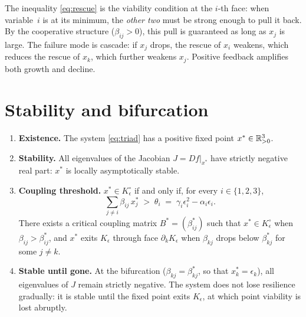 \begin{remark}\label{rem:mutual-rescue}
The inequality \eqref{eq:rescue} is the viability condition at
the $i$-th face: when variable~$i$ is at its minimum, the
\emph{other two} must be strong enough to pull it back.
By the cooperative structure ($\beta_{ij} > 0$), this pull is
guaranteed as long as $x_j$ is large.  The failure mode is
cascade: if $x_j$ drops, the rescue of $x_i$ weakens, which
reduces the rescue of $x_k$, which further weakens $x_j$.
Positive feedback amplifies both growth and decline.
\end{remark}

\section{Stability and bifurcation}\label{sec:triad-bifurcation}

\begin{theorem}
\label{thm:triad}
\hfill
\begin{enumerate}[label=(\alph*)]
  \item \textbf{Existence.}  The system \eqref{eq:triad} has a
    positive fixed point $x^* \in \mathbb{R}^3_{> 0}$.
  \item \textbf{Stability.}  All eigenvalues of the Jacobian
    $J = Df|_{x^*}$ have strictly negative real part:
    $x^*$ is locally asymptotically stable.
  \item \textbf{Coupling threshold.}  $x^* \in K_\epsilon^\circ$
    if and only if, for every $i \in \{1,2,3\}$,
    \begin{equation}\label{eq:coupling-threshold}
      \sum_{j \neq i} \beta_{ij}\, x_j^*
      \;>\;
      \theta_i
      \;=\;
      \gamma_i \epsilon_i^2 - \alpha_i \epsilon_i.
    \end{equation}
    There exists a critical coupling matrix
    $B^* = (\beta_{ij}^*)$ such that
    $x^* \in K_\epsilon^\circ$ when $\beta_{ij} > \beta_{ij}^*$,
    and $x^*$ exits $K_\epsilon$ through face
    $\partial_k K_\epsilon$ when $\beta_{kj}$ drops below
    $\beta_{kj}^*$ for some $j \neq k$.
  \item \textbf{Stable until gone.}  At the bifurcation
    ($\beta_{kj} = \beta_{kj}^*$, so that $x_k^* = \epsilon_k$),
    all eigenvalues of $J$ remain strictly negative.  The system
    does not lose resilience gradually: it is stable until the
    fixed point exits $K_\epsilon$, at which point viability is
    lost abruptly.
\end{enumerate}
\end{theorem}

